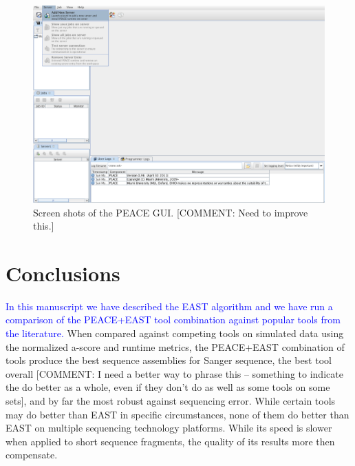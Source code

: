 \documentclass[10pt]{bmc_article}
\newcommand{\east} {{\small EAST}}
\newcommand{\peast}{{\small PEACE+EAST}}
\newenvironment{bmcformat}{\begin{raggedright}\baselineskip20pt\sloppy\setboolean{publ}{false}}{\end{raggedright}\baselineskip20pt\sloppy}
\begin{document}
\begin{bmcformat}
\begin{figure}[htb]
\centerline{\includegraphics[width=6in]{pics.d/GUI1.pdf}}
\caption{Screen shots of the PEACE GUI.  [COMMENT: Need to improve this.]}
\label{GUI-fig}
\end{figure}

\section*{Conclusions}

{\textcolor{blue}{In this manuscript we have described the \east\/ algorithm and we have run a
comparison of the \peast\/ tool combination against popular tools
from the literature.}  When compared against competing tools on simulated
data using the normalized a-score and runtime metrics, the \peast\/ combination of
tools produce the best sequence assemblies for Sanger sequence, the
best tool overall [COMMENT: I need a better way to phrase this --
something to indicate the do better as a whole, even if they don't do
as well as some tools on some sets], and by far the most robust against sequencing
error.  While certain tools may do better than \east\/ in specific circumstances,
none of them do better than EAST on multiple sequencing
technology platforms.  While its speed is slower when applied to short
sequence fragments, the quality of its results more then compensate.}
\vspace{3mm}


\end{bmcformat}
\end{document}
